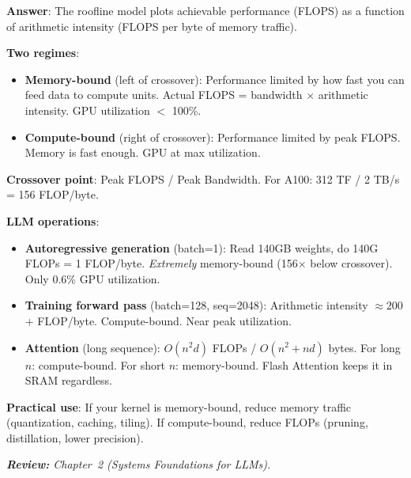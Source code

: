 \begin{questionbox}
\textbf{Answer}: The roofline model plots achievable performance (FLOPS) as a function of arithmetic intensity (FLOPS per byte of memory traffic).

\textbf{Two regimes}:

\begin{itemize}
  \item \textbf{Memory-bound} (left of crossover): Performance limited by how fast you can feed data to compute units. Actual FLOPS = bandwidth $\times$ arithmetic intensity. GPU utilization $<$ 100\%.
  \item \textbf{Compute-bound} (right of crossover): Performance limited by peak FLOPS. Memory is fast enough. GPU at max utilization.
\end{itemize}

\textbf{Crossover point}: Peak FLOPS / Peak Bandwidth. For A100: 312 TF / 2 TB/s = 156 FLOP/byte.

\textbf{LLM operations}:

\begin{itemize}
  \item \textbf{Autoregressive generation} (batch=1): Read 140GB weights, do 140G FLOPs = 1 FLOP/byte. \emph{Extremely} memory-bound (156$\times$ below crossover). Only 0.6\% GPU utilization.
  \item \textbf{Training forward pass} (batch=128, seq=2048): Arithmetic intensity $\approx 200$+ FLOP/byte. Compute-bound. Near peak utilization.
  \item \textbf{Attention} (long sequence): $O(n^2 d)$ FLOPs / $O(n^2 + nd)$ bytes. For long $n$: compute-bound. For short $n$: memory-bound. Flash Attention keeps it in SRAM regardless.
\end{itemize}

\textbf{Practical use}: If your kernel is memory-bound, reduce memory traffic (quantization, caching, tiling). If compute-bound, reduce FLOPs (pruning, distillation, lower precision).

\emph{\textbf{Review:} Chapter~2 (Systems Foundations for LLMs).}
\end{questionbox}


